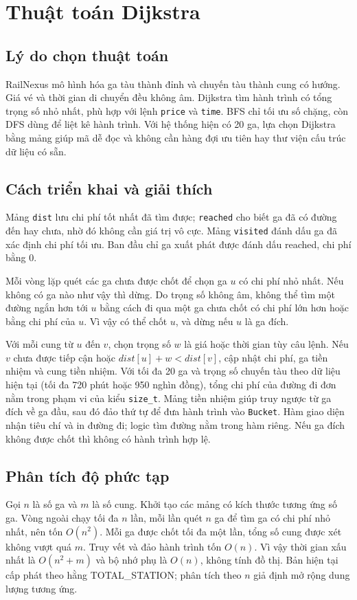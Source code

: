 \chapter{Thuật toán Dijkstra}
\section{Lý do chọn thuật toán}
RailNexus mô hình hóa ga tàu thành đỉnh và chuyến tàu thành cung có hướng. Giá vé và thời gian di chuyển đều không âm. Dijkstra tìm hành trình có tổng trọng số nhỏ nhất, phù hợp với lệnh \texttt{price} và \texttt{time}. BFS chỉ tối ưu số chặng, còn DFS dùng để liệt kê hành trình. Với hệ thống hiện có 20 ga, lựa chọn Dijkstra bằng mảng giúp mã dễ đọc và không cần hàng đợi ưu tiên hay thư viện cấu trúc dữ liệu có sẵn.
\section{Cách triển khai và giải thích}
Mảng \texttt{dist} lưu chi phí tốt nhất đã tìm được; \texttt{reached} cho biết ga đã có đường đến hay chưa, nhờ đó không cần giá trị vô cực. Mảng \texttt{visited} đánh dấu ga đã xác định chi phí tối ưu. Ban đầu chỉ ga xuất phát được đánh dấu reached, chi phí bằng 0.

Mỗi vòng lặp quét các ga chưa được chốt để chọn ga $u$ có chi phí nhỏ nhất. Nếu không có ga nào như vậy thì dừng. Do trọng số không âm, không thể tìm một đường ngắn hơn tới $u$ bằng cách đi qua một ga chưa chốt có chi phí lớn hơn hoặc bằng chi phí của $u$. Vì vậy có thể chốt $u$, và dừng nếu $u$ là ga đích.

Với mỗi cung từ $u$ đến $v$, chọn trọng số $w$ là giá hoặc thời gian tùy câu lệnh. Nếu $v$ chưa được tiếp cận hoặc $dist[u]+w<dist[v]$, cập nhật chi phí, ga tiền nhiệm và cung tiền nhiệm. Với tối đa 20 ga và trọng số chuyến tàu theo dữ liệu hiện tại (tối đa 720 phút hoặc 950 nghìn đồng), tổng chi phí của đường đi đơn nằm trong phạm vi của kiểu \texttt{size\_t}. Mảng tiền nhiệm giúp truy ngược từ ga đích về ga đầu, sau đó đảo thứ tự để đưa hành trình vào \texttt{Bucket}. Hàm giao diện nhận tiêu chí và in đường đi; logic tìm đường nằm trong hàm riêng. Nếu ga đích không được chốt thì không có hành trình hợp lệ.

\section{Phân tích độ phức tạp}
Gọi $n$ là số ga và $m$ là số cung. Khởi tạo các mảng có kích thước tương ứng số ga. Vòng ngoài chạy tối đa $n$ lần, mỗi lần quét $n$ ga để tìm ga có chi phí nhỏ nhất, nên tốn $O(n^2)$. Mỗi ga được chốt tối đa một lần, tổng số cung được xét không vượt quá $m$. Truy vết và đảo hành trình tốn $O(n)$. Vì vậy thời gian xấu nhất là $O(n^2+m)$ và bộ nhớ phụ là $O(n)$, không tính đồ thị. Bản hiện tại cấp phát theo hằng TOTAL\_STATION; phân tích theo $n$ giả định mở rộng dung lượng tương ứng.
